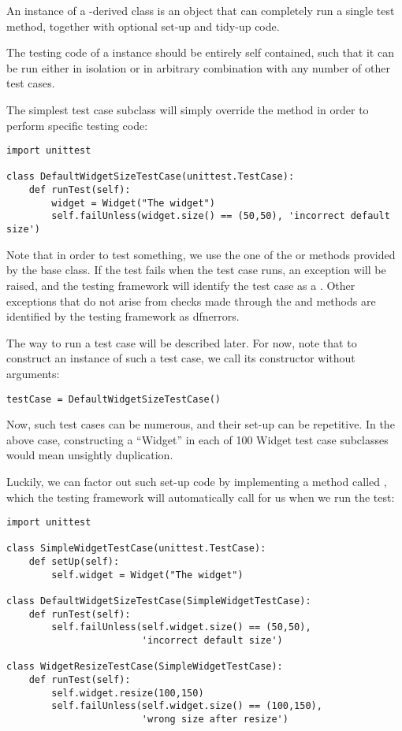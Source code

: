 An instance of a -derived class is an object that can
completely run a single test method, together with optional set-up
and tidy-up code.

The testing code of a  instance should be entirely
self contained, such that it can be run either in isolation or in
arbitrary combination with any number of other test cases.

The simplest test case subclass will simply override the
 method in order to perform specific testing code:

\begin{verbatim}
import unittest

class DefaultWidgetSizeTestCase(unittest.TestCase):
    def runTest(self):
        widget = Widget("The widget")
        self.failUnless(widget.size() == (50,50), 'incorrect default size')
\end{verbatim}

Note that in order to test something, we use the one of the
 or  methods provided by the
 base class.  If the test fails when the test case
runs, an exception will be raised, and the testing framework will
identify the test case as a .  Other exceptions that do
not arise from checks made through the  and
 methods are identified by the testing framework as
dfn{errors}.

The way to run a test case will be described later.  For now, note
that to construct an instance of such a test case, we call its
constructor without arguments:

\begin{verbatim}
testCase = DefaultWidgetSizeTestCase()
\end{verbatim}

Now, such test cases can be numerous, and their set-up can be
repetitive.  In the above case, constructing a ``Widget'' in each of
100 Widget test case subclasses would mean unsightly duplication.

Luckily, we can factor out such set-up code by implementing a method
called , which the testing framework will
automatically call for us when we run the test:

\begin{verbatim}
import unittest

class SimpleWidgetTestCase(unittest.TestCase):
    def setUp(self):
        self.widget = Widget("The widget")

class DefaultWidgetSizeTestCase(SimpleWidgetTestCase):
    def runTest(self):
        self.failUnless(self.widget.size() == (50,50),
                        'incorrect default size')

class WidgetResizeTestCase(SimpleWidgetTestCase):
    def runTest(self):
        self.widget.resize(100,150)
        self.failUnless(self.widget.size() == (100,150),
                        'wrong size after resize')
\end{verbatim}


